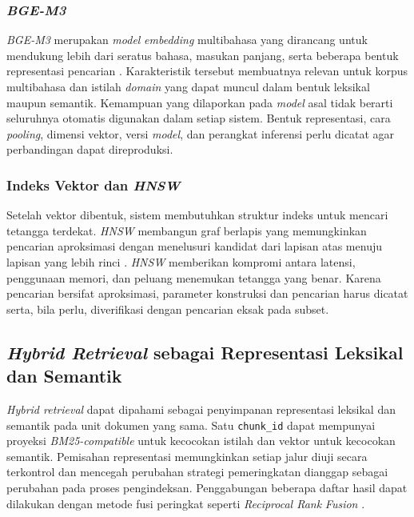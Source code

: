 \subsubsection{\emph{BGE-M3}}

\emph{BGE-M3} merupakan \emph{model} \emph{embedding} multibahasa yang dirancang untuk mendukung lebih dari seratus bahasa, masukan panjang, serta beberapa bentuk representasi pencarian \parencite{chenM3Embedding2024}. Karakteristik tersebut membuatnya relevan untuk korpus multibahasa dan istilah \emph{domain} yang dapat muncul dalam bentuk leksikal maupun semantik. Kemampuan yang dilaporkan pada \emph{model} asal tidak berarti seluruhnya otomatis digunakan dalam setiap sistem. Bentuk representasi, cara \emph{pooling}, dimensi vektor, versi \emph{model}, dan perangkat inferensi perlu dicatat agar perbandingan dapat direproduksi.

\subsubsection{Indeks Vektor dan \emph{HNSW}}

Setelah vektor dibentuk, sistem membutuhkan struktur indeks untuk mencari tetangga terdekat. \emph{HNSW} membangun graf berlapis yang memungkinkan pencarian aproksimasi dengan menelusuri kandidat dari lapisan atas menuju lapisan yang lebih rinci \parencite{malkovEfficientRobustApproximate2018}. \emph{HNSW} memberikan kompromi antara latensi, penggunaan memori, dan peluang menemukan tetangga yang benar. Karena pencarian bersifat aproksimasi, parameter konstruksi dan pencarian harus dicatat serta, bila perlu, diverifikasi dengan pencarian eksak pada subset.

\subsection{\emph{Hybrid Retrieval} sebagai Representasi Leksikal dan Semantik}

\emph{Hybrid retrieval} dapat dipahami sebagai penyimpanan representasi leksikal dan semantik pada unit dokumen yang sama. Satu \texttt{chunk\_id} dapat mempunyai proyeksi \emph{BM25-compatible} untuk kecocokan istilah dan vektor untuk kecocokan semantik. Pemisahan representasi memungkinkan setiap jalur diuji secara terkontrol dan mencegah perubahan strategi pemeringkatan dianggap sebagai perubahan pada proses pengindeksan. Penggabungan beberapa daftar hasil dapat dilakukan dengan metode fusi peringkat seperti \emph{Reciprocal Rank} \emph{Fusion} \parencite{cormackReciprocalRankFusion2009}.


